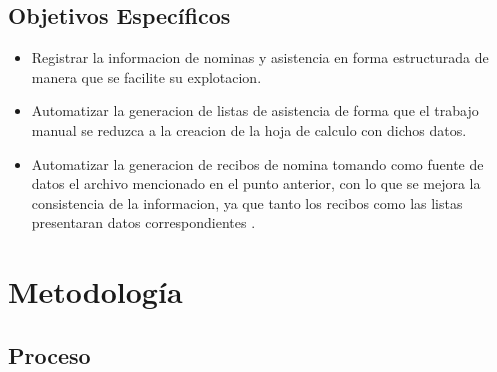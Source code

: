 \documentclass[10pt]{book}
\begin{document}
\section{Objetivos Específicos}

\begin{itemize}
	\item Registrar la informacion de nominas y asistencia en forma estructurada de manera que se facilite su explotacion.
	\item Automatizar la generacion de listas de asistencia de forma que el trabajo manual se reduzca a la creacion de la hoja de calculo con dichos datos.
	\item Automatizar la generacion de recibos de nomina tomando como fuente de datos el archivo mencionado en el punto anterior, con lo que se mejora la consistencia de la informacion, ya que tanto los recibos como las listas presentaran datos correspondientes .
\end{itemize}



%
%
%
%

	
	
\chapter{Metodología}


\section{Proceso}
\end{document}
